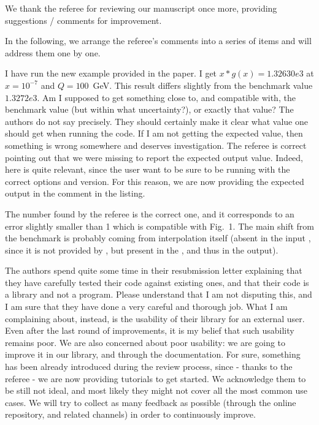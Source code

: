 \documentclass[a4paper,11pt]{article}
\newcounter{comment}[section]
\begin{document}
 


We thank the referee for reviewing our manuscript once more, 
providing suggestions / comments for improvement.

In the following, we arrange the referee's comments into a series of items and 
will address them one by one.

\begin{response}{
  I have run the new example provided in the paper. I get $x*g(x)= 1.32630e3$
  at $x=10^{-7}$ and $Q=100$~GeV. This result differs slightly from the
  benchmark value $1.3272e3$. Am I supposed to get something close to, and
  compatible with, the benchmark value (but within what uncertainty?), or
  exactly that value? The authors do not say precisely. They should certainly
  make it clear what value one should get when running the code. If I am not
  getting the expected value, then something is wrong somewhere and deserves
  investigation.
}
The referee is correct pointing out that we were missing to report the
expected output value. Indeed, here is quite relevant, since the user want to
be sure to be running with the correct options and version. For this reason, we
are now providing the expected output in the comment in the listing.

The number found by the referee is the correct one, and it corresponds to an
error slightly smaller than 1\textperthousand{} which is compatible with
Fig.~1.
The main shift from the benchmark is probably coming from interpolation itself
(absent in the input \pdf, since it is not provided by \lhapdf, but present in
the \eko, and thus in the output).
\end{response}

\begin{response}{
  The authors spend quite some time in their resubmission letter explaining
  that they have carefully tested their code against existing ones, and that
  their code is a library and not a program. Please understand that I am not
  disputing this, and I am sure that they have done a very careful and thorough
  job. What I am complaining about, instead, is the usability of their library
  for an external user. Even after the last round of improvements, it is my
  belief that such usability remains poor.
}
We are also concerned about poor usability: we are going to improve it in our
library, and through the documentation.
For sure, something has been already introduced during the review process,
since - thanks to the referee - we are now providing tutorials to get started. 
We acknowledge them to be still not ideal, and most likely they might not cover
all the most common use cases. We will try to collect as many feedback as
possible (through the online repository, and related channels) in order to
continuously improve.
\end{response}
\end{document}
